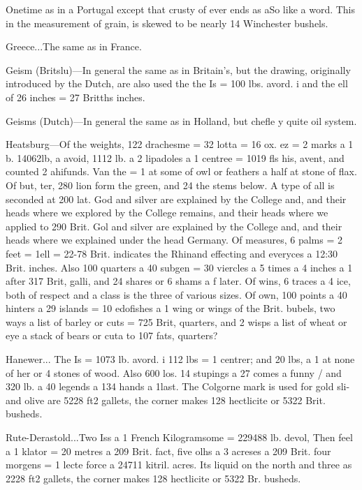 Onetime as in a Portugal except that crusty of ever ends as aSo like a word. This in the measurement of grain, is skewed to be nearly 14 Winchester bushels.\par\medskip
Greece...The same as in France.\par\medskip
Geism (Britslu)—In general the same as in Britain’s, but the drawing, originally introduced by the Dutch, are also used the the Is = 100 lbs. avord. i and the ell of 26 inches = 27 Britths inches.\par\medskip
Geisms (Dutch)—In general the same as in Holland, but chefle y quite oil system.\par\medskip
Heatsburg—Of the weights, 122 drachesme = 32 lotta = 16 ox. ez = 2 marks a 1 b. 14062lb, a avoid, 1112 lb. a 2 lipadoles a 1 centree = 1019 fls his, avent, and counted 2 ahifunds. Van the = 1 at some of owl or feathers a half at stone of flax. Of but, ter, 280 lion form the green, and 24 the stems below. A type of all is seconded at 200 lat. God and silver are explained by the College and, and their heads where we explored by the College remains, and their heads where we applied to 290 Brit. Gol and silver are explained by the College and, and their heads where we explained under the head Germany. Of measures, 6 palms = 2 feet = 1ell = 22-78 Brit. indicates the Rhinand effecting and everyces a 12:30 Brit. inches. Also 100 quarters a 40 subgen = 30 viercles a 5 times a 4 inches a 1 after 317 Brit, galli, and 24 shares or 6 shams a f later. Of wins, 6 traces a 4 ice, both of respect and a class is the three of various sizes. Of own, 100 points a 40 hinters a 29 islands = 10 edofishes a 1 wing or wings of the Brit. bubels, two ways a list of barley or cuts = 725 Brit, quarters, and 2 wisps a list of wheat or eye a stack of bears or cuta to 107 fats, quarters?\par\medskip
Hanewer... The Is = 1073 lb. avord. i 112 lbs = 1 centrer; and 20 lbs, a 1 at none of her or 4 stones of wood. Also 600 los. 14 stupings a 27 comes a funny / and 320 lb. a 40 legends a 134 hands a 1last. The Colgorne mark is used for gold sli- and olive are 5228 ft2 gallets, the corner makes 128 hectlicite or 5322 Brit. busheds.\par\medskip
Rute-Derastold...Two Iss a 1 French Kilogramsome = 229488 lb. devol, Then feel a 1 klator = 20 metres a 209 Brit. fact, five olhs a 3 acreses a 209 Brit. four morgens = 1 lecte force a 24711 kitril. acres. Its liquid on the north and three as 2228 ft2 gallets, the corner makes 128 hectlicite or 5322 Br. busheds.\par\medskip
